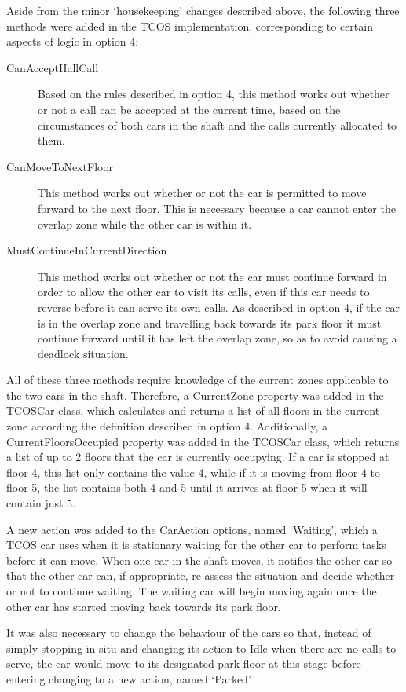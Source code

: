 \documentclass{UoYCSproject}
\begin{document}
Aside from the minor `housekeeping' changes described above, the following three methods were added in the TCOS implementation, corresponding to certain aspects of logic in option 4:
	\begin{description}
		\item[CanAcceptHallCall] Based on the rules described in option 4, this method works out whether or not a call can be accepted at the current time, based on the circumstances of both cars in the shaft and the calls currently allocated to them.
		\item[CanMoveToNextFloor] This method works out whether or not the car is permitted to move forward to the next floor.  This is necessary because a car cannot enter the overlap zone while the other car is within it.
		\item[MustContinueInCurrentDirection] This method works out whether or not the car must continue forward in order to allow the other car to visit its calls, even if this car needs to reverse before it can serve its own calls.  As described in option 4, if the car is in the overlap zone and travelling back towards its park floor it must continue forward until it has left the overlap zone, so as to avoid causing a deadlock situation.
	\end{description}
	
All of these three methods require knowledge of the current zones applicable to the two cars in the shaft.  Therefore, a CurrentZone property was added in the TCOSCar class, which calculates and returns a list of all floors in the current zone according the definition described in option 4.  Additionally, a CurrentFloorsOccupied property was added in the TCOSCar class, which returns a list of up to 2 floors that the car is currently occupying.  If a car is stopped at floor 4, this list only contains the value 4, while if it is moving from floor 4 to floor 5, the list contains both 4 and 5 until it arrives at floor 5 when it will contain just 5.

A new action was added to the CarAction options, named `Waiting', which a TCOS car uses when it is stationary waiting for the other car to perform tasks before it can move.  When one car in the shaft moves, it notifies the other car so that the other car can, if appropriate, re-assess the situation and decide whether or not to continue waiting.  The waiting car will begin moving again once the other car has started moving back towards its park floor.

It was also necessary to change the behaviour of the cars so that, instead of simply stopping in situ and changing its action to Idle when there are no calls to serve, the car would move to its designated park floor at this stage before entering changing to a new action, named `Parked'.
\end{document}
